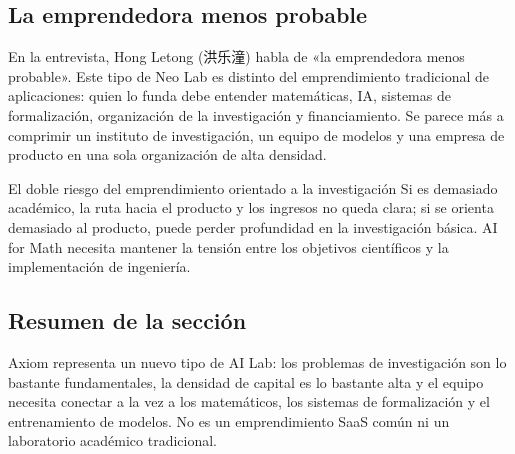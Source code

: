 \subsection{La emprendedora menos probable}

En la entrevista, Hong Letong (洪乐潼) habla de «la emprendedora menos probable». Este tipo de Neo Lab es distinto del emprendimiento tradicional de aplicaciones: quien lo funda debe entender matemáticas, IA, sistemas de formalización, organización de la investigación y financiamiento. Se parece más a comprimir un instituto de investigación, un equipo de modelos y una empresa de producto en una sola organización de alta densidad.

\begin{warningbox}{El doble riesgo del emprendimiento orientado a la investigación}
Si es demasiado académico, la ruta hacia el producto y los ingresos no queda clara; si se orienta demasiado al producto, puede perder profundidad en la investigación básica. AI for Math necesita mantener la tensión entre los objetivos científicos y la implementación de ingeniería.
\end{warningbox}

\subsection{Resumen de la sección}

Axiom representa un nuevo tipo de AI Lab: los problemas de investigación son lo bastante fundamentales, la densidad de capital es lo bastante alta y el equipo necesita conectar a la vez a los matemáticos, los sistemas de formalización y el entrenamiento de modelos. No es un emprendimiento SaaS común ni un laboratorio académico tradicional.
